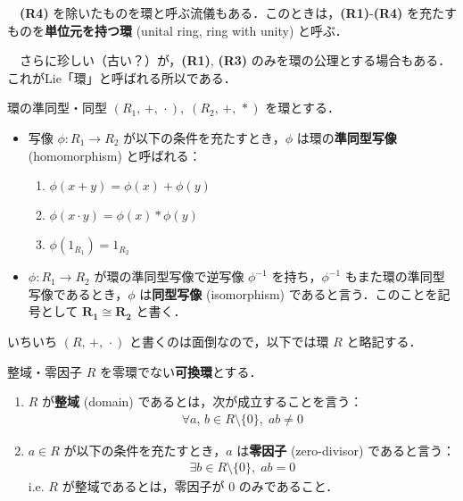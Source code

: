 \documentclass[geometry_main]{subfiles}
\begin{document}
\begin{marker}
	　\textbf{(R4)} を除いたものを環と呼ぶ流儀もある．このときは，\textbf{(R1)}-\textbf{(R4)} を充たすものを\textbf{単位元を持つ環} (unital ring, ring with unity) と呼ぶ．

	　さらに珍しい（古い？）が，\textbf{(R1)}, \textbf{(R3)} のみを環の公理とする場合もある．これがLie「環」と呼ばれる所以である．
\end{marker}

\begin{mydef}[label=def:homo-ring]{環の準同型・同型}
	$(R_1,\, +,\, \cdot\mathrel{}),\; (R_2,\, +,\, *\mathrel{})$ を環とする．
	\begin{itemize}
		\item 写像 $\phi \colon R_1 \to R_2$ が以下の条件を充たすとき，$\phi$ は環の\textbf{準同型写像} (homomorphism) と呼ばれる：
		\begin{enumerate}
			\item $\phi(x + y) = \phi(x) + \phi(y)$
			\item $\phi(x \cdot y) = \phi(x) * \phi(y)$
			\item $\phi(1_{R_1}) = 1_{R_2}$
		\end{enumerate}
		\item $\phi \colon R_1 \to R_2$ が環の準同型写像で逆写像 $\phi^{-1}$ を持ち，$\phi^{-1}$ もまた環の準同型写像であるとき，$\phi$ は\textbf{同型写像} (isomorphism) であると言う．このことを記号として $\bm{R_1 \cong R_2}$ と書く．
	\end{itemize}
\end{mydef}
いちいち $(R,\, +,\, \cdot\mathrel{})$ と書くのは面倒なので，以下では環 $R$ と略記する．

\begin{mydef}[label=def:domain]{整域・零因子}
	$R$ を零環でない\textbf{可換環}とする．
	\begin{enumerate}
		\item $R$ が\textbf{整域} (domain) であるとは，次が成立することを言う：
		\begin{align}
			\forall a,\, b \in R\setminus \{0\},\; ab \neq 0
		\end{align}
		\item $a \in R$ が以下の条件を充たすとき，$a$ は\textbf{零因子} (zero-divisor) であると言う：
		\begin{align}
			\exists b \in R\setminus \{0\},\; ab = 0
		\end{align}
		i.e. $R$ が整域であるとは，零因子が $0$ のみであること． 
	\end{enumerate}
\end{mydef}
\end{document}
